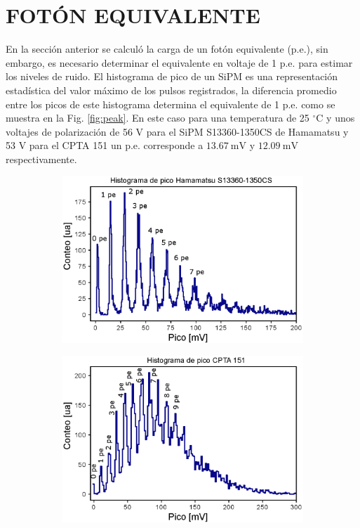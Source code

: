 \section{FOTÓN EQUIVALENTE}
En la sección anterior se calculó la carga de un fotón equivalente (p.e.), sin embargo, es necesario determinar el equivalente en voltaje de 1 p.e. para estimar los niveles de ruido. El histograma de pico de un SiPM es una representación estadística del valor máximo de los pulsos registrados, la diferencia promedio entre los picos de este histograma determina el equivalente de 1 p.e. como se muestra en la Fig. \ref{fig:peak}. En este caso para una temperatura de 25 $^\circ$C y unos voltajes de polarización de 56 V para el SiPM S13360-1350CS de Hamamatsu y 53 V para el  CPTA 151 un p.e. corresponde a $13.67~\mbox{mV}$ y $12.09~\mbox{mV}$ respectivamente.    
\begin{figure}[h!]
     \centering
     \begin{subfigure}[b]{0.49\textwidth}
         \centering
         \includegraphics[width=1.1\textwidth]{Images/Peak_1350CS.eps}
         \caption{}
         \label{fig:peak_1350CS}
     \end{subfigure}
     \begin{subfigure}[b]{0.49\textwidth}
         \centering
         \includegraphics[width=1.1\textwidth]{Images/Peak_CPTA.eps}

\end{subfigure}
\end{figure}
